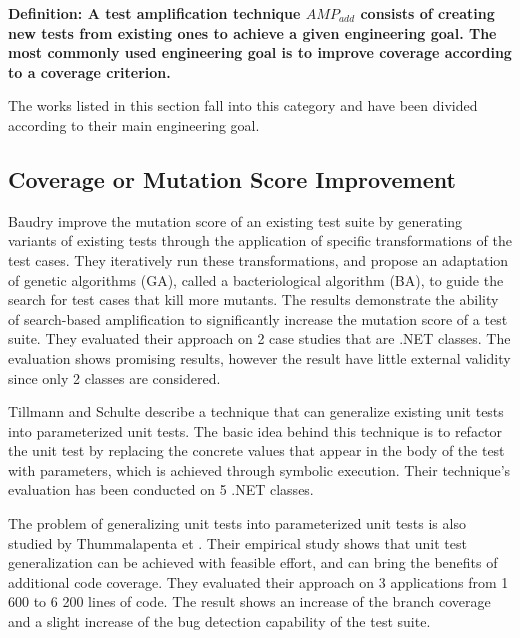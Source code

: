 \medskip
\textbf{Definition: A test amplification technique $AMP_{add}$ consists of creating new tests from existing ones to achieve a given engineering goal.
	The most commonly used engineering goal is to improve coverage according to a coverage criterion.}

The works listed in this section fall into this category and have been divided according to their main engineering goal.

\subsection{Coverage or Mutation Score Improvement}
\label{subsec:sota:category-1:coverage-vs-mutation}

Baudry \ie \cite{Baudry05a} \cite{Baudry05d} improve the mutation score of an existing test suite by generating variants of existing tests through the application of specific transformations of the test cases. 
They iteratively run these transformations, and propose an adaptation of genetic algorithms (GA), called a bacteriological algorithm (BA), to guide the search for test cases that kill more mutants.  
The results demonstrate the ability of search-based amplification to significantly increase the mutation score of a test suite.
They evaluated their approach on 2 case studies that are .NET classes.
The evaluation shows promising results, however the result have little external validity since only 2 classes are considered.

Tillmann and Schulte \cite{tillmann2006unit} describe a technique that can generalize existing unit tests into parameterized unit tests. 
The basic idea behind this technique is to refactor the unit test by replacing the concrete values that appear in the body of the test with parameters, which is achieved through symbolic execution. 
Their technique's evaluation has been conducted on 5 .NET classes.

The problem of generalizing unit tests into parameterized unit tests is also studied by Thummalapenta et \etal\cite{marri2010retrofitting}. 
Their empirical study shows that unit test generalization can be achieved with feasible effort, and can bring the benefits of additional code coverage.
They evaluated their approach on 3 applications from 1 600 to 6 200 lines of code. 
The result shows an increase of the branch coverage and a slight increase of the bug detection capability of the test suite.

